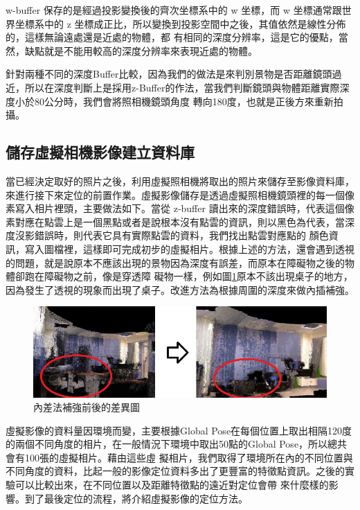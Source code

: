     w-buffer 保存的是經過投影變換後的齊次坐標系中的 w 坐標，而 w 坐標通常跟世界坐標系中的 z 坐標成正比，所以變換到投影空間中之後，其值依然是線性分佈的，這樣無論遠處還是近處的物體，都
    有相同的深度分辨率，這是它的優點，當然，缺點就是不能用較高的深度分辨率來表現近處的物體。
    
    針對兩種不同的深度Buffer比較，因為我們的做法是來判別景物是否距離鏡頭過近，所以在深度判斷上是採用z-Buffer的作法，當我們判斷鏡頭與物體距離實際深度小於80公分時，我們會將照相機鏡頭角度
    轉向180度，也就是正後方來重新拍攝。
    

\subsection{儲存虛擬相機影像建立資料庫}
%
	當已經決定取好的照片之後，利用虛擬照相機將取出的照片來儲存至影像資料庫，來進行接下來定位的前置作業。虛擬影像儲存是透過虛擬照相機鏡頭裡的每一個像素寫入相片裡頭，主要做法如下。當從 
	z-buffer 讀出來的深度錯誤時，代表這個像素對應在點雲上是一個黑點或者是說根本沒有點雲的資訊，則以黑色為代表，當深度沒影錯誤時，則代表它具有實際點雲的資料，我們找出點雲對應點的
	顏色資訊，寫入圖檔裡，這樣即可完成初步的虛擬相片。根據上述的方法，還會遇到透視的問題，就是說原本不應該出現的景物因為深度有誤差，而原本在障礙物之後的物體卻跑在障礙物之前，像是穿透障
	礙物一樣，例如圖\ref{fig:interpolation}原本不該出現桌子的地方，因為發生了透視的現象而出現了桌子。改進方法為根據周圍的深度來做內插補強。
	
	\begin{figure}
	\begin{center}
	  \includegraphics[width=1.0\textwidth]{figures/Depth_Interpolation.jpg}
	  \caption{內差法補強前後的差異圖}
	  \label{fig:interpolation}
	\end{center}
	\end{figure}	
	
	虛擬影像的資料量因環境而變，主要根據Global Pose在每個位置上取出相隔120度的兩個不同角度的相片，在一般情況下環境中取出50點的Global Pose，所以總共會有100張的虛擬相片。藉由這些虛
	擬相片，我們取得了環境所在內的不同位置與不同角度的資料，比起一般的影像定位資料多出了更豐富的特徵點資訊。之後的實驗可以比較出來，在不同位置以及距離特徵點的遠近對定位會帶
	來什麼樣的影響。到了最後定位的流程，將介紹虛擬影像的定位方法。

